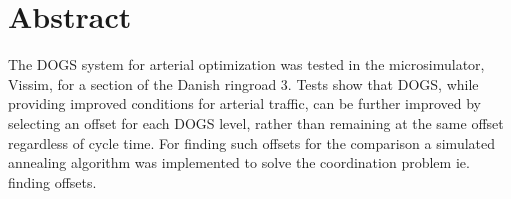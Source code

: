 \section{Abstract}
The DOGS system for arterial optimization was tested in the microsimulator, Vissim, for a section of the Danish ringroad 3. Tests show that DOGS, while providing improved conditions for arterial traffic, can be further improved by selecting an offset for each DOGS level, rather than remaining at the same offset regardless of cycle time. For finding such offsets for the comparison a simulated annealing algorithm was implemented to solve the coordination problem ie. finding offsets.